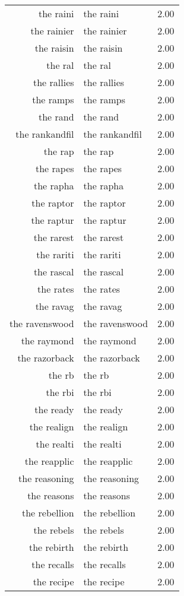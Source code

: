 \begin{table}[ht]
\begin{tabular}{rlr}
  the raini & the raini & 2.00 \\ 
  the rainier & the rainier & 2.00 \\ 
  the raisin & the raisin & 2.00 \\ 
  the ral & the ral & 2.00 \\ 
  the rallies & the rallies & 2.00 \\ 
  the ramps & the ramps & 2.00 \\ 
  the rand & the rand & 2.00 \\ 
  the rankandfil & the rankandfil & 2.00 \\ 
  the rap & the rap & 2.00 \\ 
  the rapes & the rapes & 2.00 \\ 
  the rapha & the rapha & 2.00 \\ 
  the raptor & the raptor & 2.00 \\ 
  the raptur & the raptur & 2.00 \\ 
  the rarest & the rarest & 2.00 \\ 
  the rariti & the rariti & 2.00 \\ 
  the rascal & the rascal & 2.00 \\ 
  the rates & the rates & 2.00 \\ 
  the ravag & the ravag & 2.00 \\ 
  the ravenswood & the ravenswood & 2.00 \\ 
  the raymond & the raymond & 2.00 \\ 
  the razorback & the razorback & 2.00 \\ 
  the rb & the rb & 2.00 \\ 
  the rbi & the rbi & 2.00 \\ 
  the ready & the ready & 2.00 \\ 
  the realign & the realign & 2.00 \\ 
  the realti & the realti & 2.00 \\ 
  the reapplic & the reapplic & 2.00 \\ 
  the reasoning & the reasoning & 2.00 \\ 
  the reasons & the reasons & 2.00 \\ 
  the rebellion & the rebellion & 2.00 \\ 
  the rebels & the rebels & 2.00 \\ 
  the rebirth & the rebirth & 2.00 \\ 
  the recalls & the recalls & 2.00 \\ 
  the recipe & the recipe & 2.00 \\ 

\end{tabular}
\end{table}
